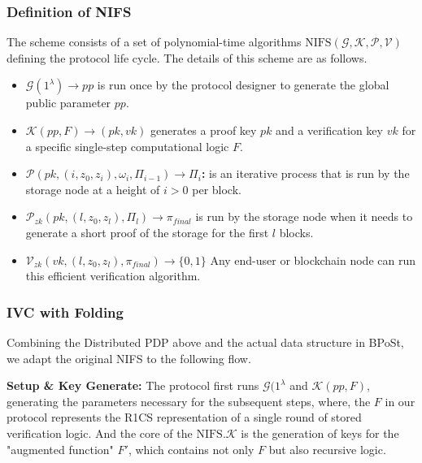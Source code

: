 \documentclass[journal]{IEEEtran}
\begin{document}
\subsubsection{Definition of NIFS}
The scheme consists of a set of polynomial-time algorithms $\text{NIFS}(\mathcal{G}, \mathcal{K}, \mathcal{P}, \mathcal{V})$ defining the protocol life cycle. The details of this scheme are as follows.
\begin{itemize}
    \item \textbf{$\mathcal{G}(1^{\lambda}) \rightarrow pp$} is run once by the protocol designer to generate the global public parameter $pp$.
    \item \textbf{$\mathcal{K}(pp, F) \rightarrow (pk, vk)$} generates a proof key $pk$ and a verification key $vk$ for a specific single-step computational logic $F$. 
    \item \textbf{$\mathcal{P}(pk, (i, z_0, z_i), \omega_i, \Pi_{i-1}) \rightarrow \Pi_i$:} is an iterative process that is run by the storage node at a height of $i>0$ per block.
    \item \textbf{$\mathcal{P}_{zk}(pk, (l, z_0, z_l), \Pi_l) \rightarrow \pi_{final}$} is run by the storage node when it needs to generate a short proof of the storage for the first $l$ blocks.
    \item \textbf{$\mathcal{V}_{zk}(vk, (l, z_0, z_l), \pi_{final}) \rightarrow \{0,1\}$} Any end-user or blockchain node can run this efficient verification algorithm.
\end{itemize}


\subsubsection{IVC with Folding}
Combining the Distributed PDP above and the actual data structure in BPoSt, we adapt the original NIFS to the following flow.


\textbf{Setup \& Key Generate:} The protocol first runs $\mathcal{G}(1^{\lambda}$ and $\mathcal{K}(pp, F)$, generating the parameters necessary for the subsequent steps, where, the $F$ in our protocol represents the R1CS representation of a single round of stored verification logic. And the core of the $\text{NIFS}. \mathcal{K}$ is the generation of keys for the "augmented function" $F'$, which contains not only $F$ but also recursive logic.
\end{document}
